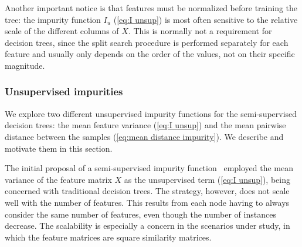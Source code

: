 Another important notice is that features must be normalized before training the tree: the impurity function $I_u$ (\autoref{eq:I unsup}) is most often sensitive to the relative scale of the different columns of $X$. This is normally not a requirement for decision trees, since the split search procedure is performed separately for each feature and usually only depends on the order of the values, not on their specific magnitude.


\subsubsection{Unsupervised impurities}
\label{sec:Iu}

We explore two different unsupervised impurity functions for the semi-supervised decision trees: the mean feature variance (\autoref{eq:I unsup}) and the mean pairwise distance between the samples (\autoref{eq:mean distance impurity}). We describe and motivate them in this section.

The initial proposal of a semi-supervised impurity function~\cite{levatic2017semisupervised} employed the mean variance of the feature matrix $X$ as the unsupervised term (\autoref{eq:I unsup}), being concerned with traditional decision trees.
The strategy, however, does not scale well with the number of features.
This results from each node having to always consider the same number of features, even though the number of instances decrease.
The scalability is especially a concern in the scenarios under study, in which the feature matrices are square similarity matrices.


